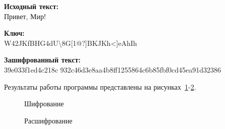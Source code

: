 \textbf{Исходный текст:} \\
    Привет, Мир! 

\textbf{Ключ:} \\
    W42JKfBHG4dU\textbackslash8G[1@?]BKJKh<]eAhIh

\textbf{Зашифрованный текст:} \\
    39e033f1ed4c218c 932c46d3e8aa4b8ff1255864c6b85fbf0cd45ea91d32386

Результаты работы программы представлены на рисунках~\ref{ris:encode-test-2}-\ref{ris:decode-test-2}.

\vspace{\baselineskip}
\begin{figure}[H]
    \caption{Шифрование}
\label{ris:encode-test-2}
\end{figure}

\vspace{\baselineskip}
\begin{figure}[H]
    \caption{Расшифрование}
\label{ris:decode-test-2}
\end{figure}
